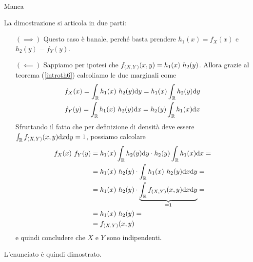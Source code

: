\ParteSoluzioni

\Soluzione{}
Manca

\Soluzione{}
La dimostrazione si articola in due parti:
\begin{enumerate}
\item [$(\implies)$] Questo caso è banale, perché basta prendere $h_1(x)=f_X(x)$ e $h_2(y)=f_Y(y)$.

\item [$(\impliedby)$] Sappiamo per ipotesi che $\fXYxy=h_1(x)\ h_2(y)$. Allora grazie al teorema (\ref{introth6}) calcoliamo le due marginali come
\begin{gather*}
\begin{aligned}
&f_X(x)=\int_{\mathbb{R}} h_1(x)\ h_2(y) \mathrm{d} y=h_1(x)\int_{\mathbb{R}} h_2(y) \mathrm{d} y \\
&f_Y(y)=\int_{\mathbb{R}} h_1(x)\ h_2(y) \mathrm{d} x=h_2(y)\int_{\mathbb{R}} h_1(x) \mathrm{d} x
\end{aligned}
\end{gather*}
Sfruttando il fatto che per definizione di densità deve essere $\int_{\mathbb{R}}f_{(X,Y)}(x,y)\mathrm{d} x \mathrm{d} y=1$, possiamo calcolare
\begin{gather*}
\begin{aligned}
f_X(x)\ f_Y(y)&=h_1(x)\int_{\mathbb{R}} h_2(y) \mathrm{d} y\cdot h_2(y)\int_{\mathbb{R}} h_1(x) \mathrm{d} x=\\
&=h_1(x)\ h_2(y) \cdot \int_{\mathbb{R}} h_1(x)\ h_2(y) \mathrm{d} x \mathrm{d} y=\\
&=h_1(x)\ h_2(y) \cdot \underbrace{\int_{\mathbb{R}} f_{(X,Y)}(x,y) \mathrm{d} x \mathrm{d} y}_{=1}=\\
&=h_1(x)\ h_2(y)=\\
&=f_{(X,Y)}(x,y)
\end{aligned}
\end{gather*}
e quindi concludere che $X$ e $Y$ sono indipendenti.
\end{enumerate}
L'enunciato è quindi dimostrato.

